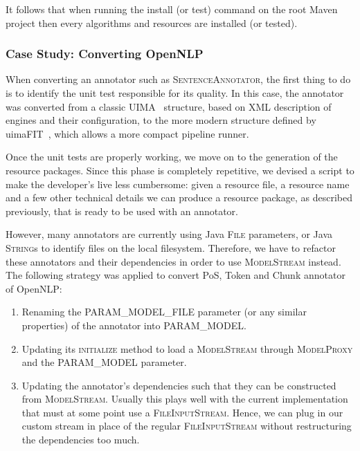 \documentclass{article}
\newcommand{\ID}[1]{{\textsc{#1}}}
\begin{document}
\begin{appendices}
It follows that when running the install (or test) command on the root Maven project then every
algorithms and resources are installed (or tested).

\subsubsection{Case Study: Converting OpenNLP}

When converting an annotator such as \ID{SentenceAnnotator}, the first thing to do is to identify
the unit test responsible for its quality. In this case, the annotator was converted from a classic
UIMA~\cite{uima} structure, based on XML description of engines and their configuration, to the more
modern structure defined by uimaFIT~\cite{uimafit}, which allows a more compact pipeline runner.

Once the unit tests are properly working, we move on to the generation of the resource packages.
Since this phase is completely repetitive, we devised a script to make the developer's live less
cumbersome: given a resource file, a resource name and a few other technical details we can produce
a resource package, as described previously, that is ready to be used with an annotator.

However, many annotators are currently using Java \ID{File} parameters, or Java \ID{String}s to
identify files on the local filesystem. Therefore, we have to refactor these annotators and their
dependencies in order to use \ID{ModelStream} instead. The following strategy was applied to convert
PoS, Token and Chunk annotator of OpenNLP:

\begin{enumerate}

    \item Renaming the \ID{PARAM\_MODEL\_FILE} parameter (or any similar properties) of the annotator
        into \ID{PARAM\_MODEL}.

    \item Updating its \ID{initialize} method to load a \ID{ModelStream} through \ID{ModelProxy} and the
        \ID{PARAM\_MODEL} parameter.

    \item Updating the annotator's dependencies such that they can be constructed from \ID{ModelStream}.
        Usually this plays well with the current implementation that must at some point use a
        \ID{FileInputStream}. Hence, we can plug in our custom stream in place of the regular
        \ID{FileInputStream} without restructuring the dependencies too much.


\end{enumerate}
\end{appendices}
\end{document}

